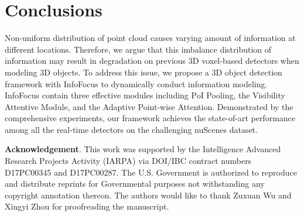 \documentclass[runningheads]{llncs}
\begin{document}
\section{Conclusions}
Non-uniform distribution of point cloud causes varying amount of information at different locations. Therefore, we argue that this imbalance distribution of information may result in degradation on previous 3D voxel-based detectors when modeling 3D objects. To address this issue, we propose a 3D object detection framework with InfoFocus to dynamically conduct information modeling. InfoFocus contain three effective modules including PoI Pooling, the Visibility Attentive Module, and the Adaptive Point-wise Attention. Demonstrated by the comprehensive experiments, our framework achieves the state-of-art performance among all the real-time detectors on the challenging nuScenes dataset.

\noindent\textbf{Acknowledgement}. This work was supported by the Intelligence Advanced Research Projects Activity (IARPA) via DOI/IBC contract numbers D17PC00345 and D17PC00287. The U.S. Government is authorized to reproduce and distribute reprints for Governmental purposes not withstanding any copyright annotation thereon. The authors would like to thank Zuxuan Wu and Xingyi Zhou for proofreading the manuscript.




\clearpage


\end{document}
